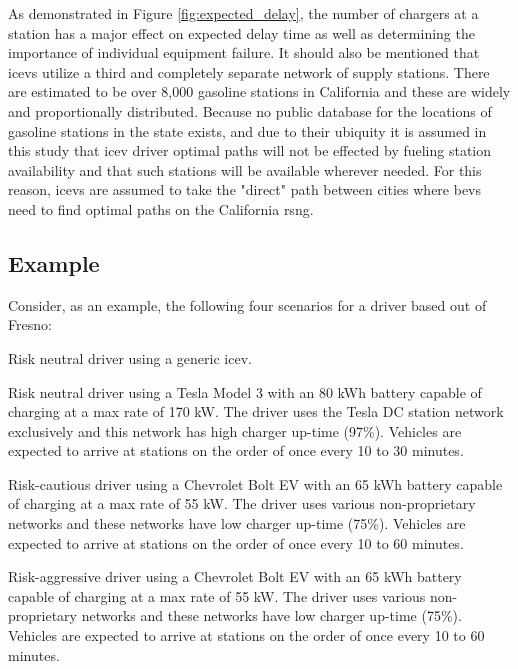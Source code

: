 \documentclass[11pt]{article}
\begin{document}
\begin{multicols}{2}
As demonstrated in Figure \ref{fig:expected_delay}, the number of chargers at a station has a major effect on expected delay time as well as determining the importance of individual equipment failure. It should also be mentioned that \glspl{icev} utilize a third and completely separate network of supply stations. There are estimated to be over 8,000 gasoline stations in California \cite{CEC_2022} and these are widely and proportionally distributed. Because no public database for the locations of gasoline stations in the state exists, and due to their ubiquity it is assumed in this study that \gls{icev} driver optimal paths will not be effected by fueling station availability and that such stations will be available wherever needed. For this reason, \glspl{icev} are assumed to take the "direct" path between cities where \glspl{bev} need to find optimal paths on the California \gls{rsng}.

\subsection*{Example}

Consider, as an example, the following four scenarios for a driver based out of Fresno:


\begin{compactenum}
	\item Risk neutral driver using a generic \gls{icev}.
	\item Risk neutral driver using a Tesla Model 3 with an 80 kWh battery capable of charging at a max rate of 170 kW. The driver uses the Tesla DC station network exclusively and this network has high charger up-time (97\%). Vehicles are expected to arrive at stations on the order of once every 10 to 30 minutes.
	\item Risk-cautious driver using a Chevrolet Bolt EV with an 65 kWh battery capable of charging at a max rate of 55 kW. The driver uses various non-proprietary networks and these networks have low charger up-time (75\%). Vehicles are expected to arrive at stations on the order of once every 10 to 60 minutes.
	\item Risk-aggressive driver using a Chevrolet Bolt EV with an 65 kWh battery capable of charging at a max rate of 55 kW. The driver uses various non-proprietary networks and these networks have low charger up-time (75\%). Vehicles are expected to arrive at stations on the order of once every 10 to 60 minutes.
\end{compactenum}


\end{multicols}
\end{document}
